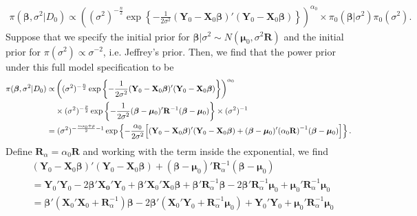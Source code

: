 \documentclass[11pt]{article}
\begin{document}
\begin{itemize}
\begin{align*}
\pi(\boldsymbol\beta,\sigma^2|D_0) \propto \left((\sigma^2)^{-\frac{n}{2}}\exp\left\{-\frac{1}{2\sigma^2}(\mathbf{Y}_0-\mathbf{X}_0\boldsymbol\beta)'(\mathbf{Y}_0-\mathbf{X}_0\boldsymbol\beta)\right\}\right)^{\alpha_0}\times \pi_0(\boldsymbol\beta|\sigma^2)\pi_0(\sigma^2).
\end{align*}
Suppose that we specify the initial prior for $\boldsymbol\beta|\sigma^2 \sim N(\boldsymbol\mu_0, \sigma^2\mathbf{R})$ and the initial prior for $
\pi(\sigma^2)\propto \sigma^{-2}$, i.e. Jeffrey's prior.  Then, we find that the power prior under this full model specification to be
\begin{align*}
\pi(\boldsymbol\beta,\sigma^2|D_0) \propto& \left((\sigma^2)^{-\frac{n}{2}}\exp\left\{-\frac{1}{2\sigma^2}(\mathbf{Y}_0-\mathbf{X}_0\boldsymbol\beta)'(\mathbf{Y}_0-\mathbf{X}_0\boldsymbol\beta)\right\}\right)^{\alpha_0} \\
&\times (\sigma^2)^{-\frac{p}{2}}\exp\left\{-\frac{1}{2\sigma^2}(\boldsymbol\beta - \boldsymbol\mu_0)'\mathbf{R}^{-1}(\boldsymbol\beta - \boldsymbol\mu_0)\right\}\times (\sigma^2)^{-1} \\
=&\hspace{1mm} (\sigma^2)^{-\frac{n\alpha_0+p}{2} - 1}\exp\left\{-\frac{\alpha_0}{2\sigma^2}\Big{[}(\mathbf{Y}_0-\mathbf{X}_0\boldsymbol\beta)'(\mathbf{Y}_0-\mathbf{X}_0\boldsymbol\beta) + (\boldsymbol\beta - \boldsymbol\mu_0)'(\alpha_0\mathbf{R)}^{-1}(\boldsymbol\beta - \boldsymbol\mu_0)\Big{]} \right\}.
\end{align*}
Define $\mathbf{R}_\alpha = \alpha_0\mathbf{R}$ and working with the term inside the exponential, we find
\begin{align*}
&(\mathbf{Y}_0-\mathbf{X}_0\boldsymbol\beta)'(\mathbf{Y}_0-\mathbf{X}_0\boldsymbol\beta) + (\boldsymbol\beta - \boldsymbol\mu_0)'\mathbf{R}_\alpha^{-1}(\boldsymbol\beta - \boldsymbol\mu_0) \\
&= \mathbf{Y}_0'\mathbf{Y}_0 - 2\boldsymbol\beta'\mathbf{\mathbf{X}_0}'\mathbf{Y}_0 +\boldsymbol\beta'\mathbf{X}_0'\mathbf{X}_0\boldsymbol\beta + \boldsymbol\beta'\mathbf{R}_\alpha^{-1}\boldsymbol\beta - 2\boldsymbol\beta'\mathbf{R}_\alpha^{-1}\boldsymbol\mu_0 + \boldsymbol\mu_0'\mathbf{R}_\alpha^{-1}\boldsymbol\mu_0 \\
&= \boldsymbol\beta'(\mathbf{X}_0'\mathbf{X}_0 + \mathbf{R}_\alpha^{-1})\boldsymbol\beta - 2\boldsymbol\beta'(\mathbf{X}_0'\mathbf{Y}_0 + \mathbf{R}_\alpha^{-1}\boldsymbol\mu_0) + \mathbf{Y}_0'\mathbf{Y}_0 + \boldsymbol\mu_0'\mathbf{R}_\alpha^{-1}\boldsymbol\mu_0 \\

\end{align*}
\end{itemize}
\end{document}
